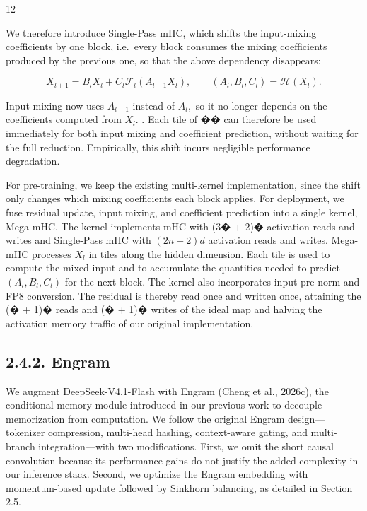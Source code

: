 \documentclass[
  10
]{article}
\begin{document}
12

We therefore introduce Single-Pass mHC, which shifts the input-mixing
coefficients by one block, i.e.~every block consumes the mixing
coefficients produced by the previous one, so that the above dependency
disappears:

\[
X _ { l + 1 } = B _ { l } X _ { l } + C _ { l } \mathcal { F } _ { l } ( A _ { l - 1 } X _ { l } ) , \qquad ( A _ { l } , B _ { l } , C _ { l } ) = \mathcal { H } ( X _ { l } ) .\tag{6}
\]

Input mixing now uses \(A _ { l - 1 }\) instead of \(A _ { l } ,\) so it
no longer depends on the coefficients computed from \(X _ { l } .\) .
Each tile of �� can therefore be used immediately for both input mixing
and coefficient prediction, without waiting for the full reduction.
Empirically, this shift incurs negligible performance degradation.

For pre-training, we keep the existing multi-kernel implementation,
since the shift only changes which mixing coefficients each block
applies. For deployment, we fuse residual update, input mixing, and
coefficient prediction into a single kernel, Mega-mHC. The kernel
implements mHC with (3� + 2)� activation reads and writes and
Single-Pass mHC with \(( 2 n + 2 ) d\) activation reads and writes.
Mega-mHC processes \(X _ { l }\) in tiles along the hidden dimension.
Each tile is used to compute the mixed input and to accumulate the
quantities needed to predict
\(\left( A _ { l } , B _ { l } , C _ { l } \right)\) for the next block.
The kernel also incorporates input pre-norm and FP8 conversion. The
residual is thereby read once and written once, attaining the (� + 1)�
reads and (� + 1)� writes of the ideal map and halving the activation
memory traffic of our original implementation.

\subsection{2.4.2. Engram}\label{engram}

We augment DeepSeek-V4.1-Flash with Engram (Cheng et al., 2026c), the
conditional memory module introduced in our previous work to decouple
memorization from computation. We follow the original Engram
design---tokenizer compression, multi-head hashing, context-aware
gating, and multi-branch integration---with two modifications. First, we
omit the short causal convolution because its performance gains do not
justify the added complexity in our inference stack. Second, we optimize
the Engram embedding with momentum-based update followed by Sinkhorn
balancing, as detailed in Section 2.5.
\end{document}
